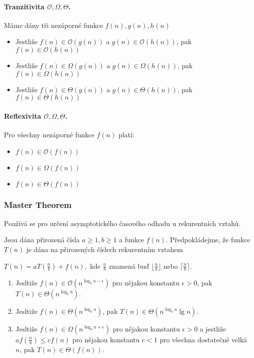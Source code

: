 \paragraph{Tranzitivita $\mathcal{O}, \Omega, \Theta$.} Máme dány tři nezáporné funkce $f(n), g(n), h(n)$
\begin{itemize}[itemsep=0pt]
    \item Jestliže $f(n) \in \mathcal{O}(g(n))$ a $g(n) \in \mathcal{O}(h(n))$, pak $f(n) \in \mathcal{O}(h(n))$
    \item Jestliže $f(n) \in \Omega(g(n))$ a $g(n) \in \Omega(h(n))$, pak $f(n) \in \Omega(h(n))$
    \item Jestliže $f(n) \in \Theta(g(n))$ a $g(n) \in \Theta(h(n))$, pak $f(n) \in \Theta(h(n))$
\end{itemize}

\paragraph{Reflexivita $\mathcal{O}, \Omega, \Theta$.} Pro všechny nezáporné funkce $f(n)$ platí:
\begin{itemize}[itemsep=0pt]
    \item $f(n) \in \mathcal{O}(f(n))$
    \item $f(n) \in \Omega(f(n))$
    \item $f(n) \in \Theta(f(n))$
\end{itemize}

\subsubsection{Master Theorem}
\label{heading:mastertheorem}
Používá se pro určení asymptotického časového odhadu u rekurentních vztahů.

\noindent
Jsou dána přirozená čísla $a \geq 1, b \geq 1$ a funkce $f(n)$. Předpokládejme, že funkce $T(n)$ je dána na přirozených číslech rekurentním vztahem

\begin{center}
    $T(n)=aT\left(\frac{n}{b}\right)+f(n),$ kde $\frac{n}{b}$ znamená buď $\lfloor \frac{n}{b} \rfloor$ nebo $\lceil \frac{n}{b} \rceil$.
\end{center}

\begin{enumerate}[itemsep=0pt]
    \item Jesltiže $f(n) \in \mathcal{O}(n^{\log_ba - \epsilon})$ pro nějakou konstantu $\epsilon > 0$, pak $T(n) \in \Theta(n^{\log_ba})$.
    
    \item Jesltiže $f(n) \in \Theta(n^{\log_ba})$, pak $T(n) \in \Theta(n^{\log_ba} \lg n)$.
    
    \item Jesltiže $f(n) \in \Omega(n^{\log_ba + \epsilon})$ pro nějakou konstantu $\epsilon > 0$ a jestliže $a f(\frac{n}{b}) \leq c f(n)$ pro nějakou konstantu $c < 1$ pro všechna dostatečně velká $n$, pak $T(n) \in \Theta(f(n))$.
\end{enumerate}

